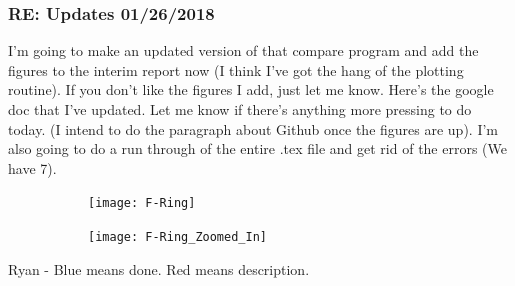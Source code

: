 \documentclass[crop=false,class=book]{standalone}
\begin{document}
\subsubsection{\footnotesize RE: Updates 01/26/2018}
I'm going to make an updated version of that compare program and add the figures to the interim report now (I think I've got the hang of the plotting routine). If you don't like the figures I add, just let me know. Here's the google doc that I've updated. Let me know if there's anything more pressing to do today. (I intend to do the paragraph about Github once the figures are up). I'm also going to do a run through of the entire .tex file and get rid of the errors (We have 7).
\begin{figure}[H]
    \centering
    \begin{subfigure}[b]{0.49\textwidth}
        \texttt{[image: F-Ring]}
    \end{subfigure}
    \begin{subfigure}[b]{0.49\textwidth}
        \texttt{[image: F-Ring\_Zoomed\_In]}
    \end{subfigure}
\end{figure}
Ryan - Blue means done. Red means description.
\end{document}
